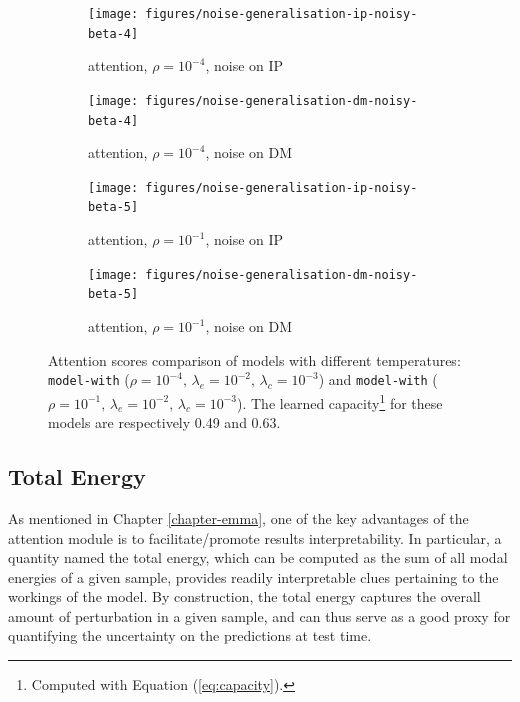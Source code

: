 \begin{figure}[!h]
\centering
\begin{subfigure}{.5\textwidth}
  \centering
  \texttt{[image: figures/noise-generalisation-ip-noisy-beta-4]}
  \caption{attention, $\rho=10^{-4}$, noise on IP} 
  \label{fig:exp-att-shift-3-a}
\end{subfigure}%
\begin{subfigure}{.5\textwidth}
  \centering
  \texttt{[image: figures/noise-generalisation-dm-noisy-beta-4]}
  \caption{attention, $\rho=10^{-4}$, noise on DM} 
  \label{fig:exp-att-shift-3-b}
\end{subfigure}
\begin{subfigure}{.5\textwidth}
  \centering
  \texttt{[image: figures/noise-generalisation-ip-noisy-beta-5]}
  \caption{attention, $\rho=10^{-1}$, noise on IP} 
  \label{fig:exp-att-shift-3-c}
\end{subfigure}%
\begin{subfigure}{.5\textwidth}
  \centering
  \texttt{[image: figures/noise-generalisation-dm-noisy-beta-5]}
  \caption{attention, $\rho=10^{-1}$, noise on DM} 
  \label{fig:exp-att-shift-3-d}
\end{subfigure}
\caption[Attention scores comparison of models with different temperatures]{Attention scores comparison of models with different temperatures: \texttt{model-with} ($\rho=10^{-4},\,\lambda_e=10^{-2},\,\lambda_c=10^{-3}$) and \texttt{model-with} ($\rho=10^{-1},\,\lambda_e=10^{-2},\,\lambda_c=10^{-3}$). The learned capacity\footnote{Computed with Equation (\ref{eq:capacity}).} for these models are respectively 0.49 and 0.63.}
\label{fig:exp-att-shift-3}
\end{figure}

\clearpage\subsection*{Total Energy}\label{sec:total-energy}
As mentioned in Chapter \ref{chapter-emma}, one of the key advantages of the attention module is to facilitate/promote results interpretability. In particular, a quantity named the total energy, which can be computed as the sum of all modal energies of a given sample, provides readily interpretable clues pertaining to the workings of the model. By construction, the total energy captures the overall amount of perturbation in a given sample, and can thus serve as a good proxy for quantifying the uncertainty on the predictions at test time.

